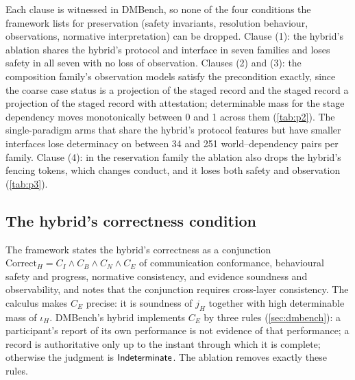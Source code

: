 Each clause is witnessed in DMBench, so none of the four conditions the framework lists for preservation (safety invariants, resolution behaviour, observations, normative interpretation) can be dropped. Clause (1): the hybrid's ablation shares the hybrid's protocol and interface in seven families and loses safety in all seven with no loss of observation. Clauses (2) and (3): the composition family's observation models satisfy the precondition exactly, since the coarse case status is a projection of the staged record and the staged record a projection of the staged record with attestation; determinable mass for the stage dependency moves monotonically between 0 and 1 across them (\cref{tab:p2}). The single-paradigm arms that share the hybrid's protocol features but have smaller interfaces lose determinacy on between 34 and 251 world--dependency pairs per family. Clause (4): in the reservation family the ablation also drops the hybrid's fencing tokens, which changes conduct, and it loses both safety and observation (\cref{tab:p3}).

\subsection{The hybrid's correctness condition}

The framework states the hybrid's correctness as a conjunction $\mathrm{Correct}_H = C_I \wedge C_B \wedge C_N \wedge C_E$ of communication conformance, behavioural safety and progress, normative consistency, and evidence soundness and observability, and notes that the conjunction requires cross-layer consistency. The calculus makes $C_E$ precise: it is soundness of $j_H$ together with high determinable mass of $\iota_H$. DMBench's hybrid implements $C_E$ by three rules (\cref{sec:dmbench}): a participant's report of its own performance is not evidence of that performance; a record is authoritative only up to the instant through which it is complete; otherwise the judgment is $\mathsf{Indeterminate}$. The ablation removes exactly these rules.
